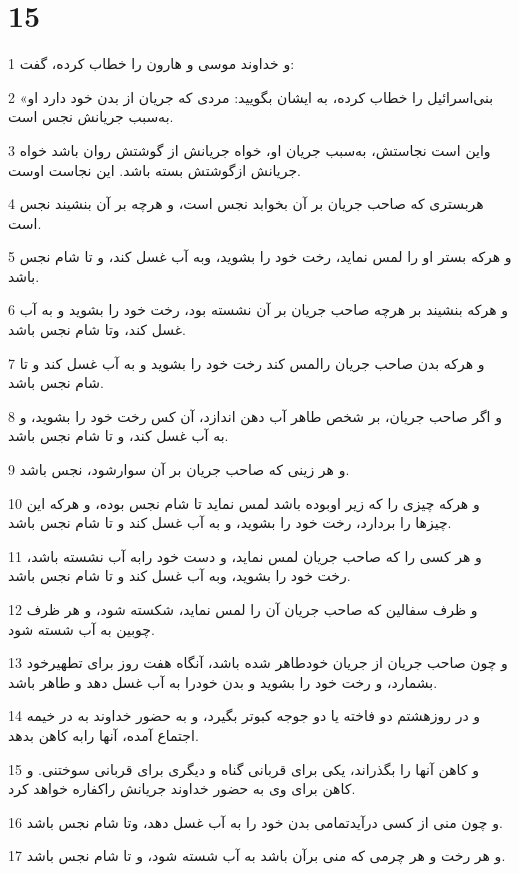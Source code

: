 \chapter{15}

\par 1 و خداوند موسی و هارون را خطاب کرده، گفت:
\par 2 «بنی‌اسرائیل را خطاب کرده، به ایشان بگویید: مردی که جریان از بدن خود دارد او به‌سبب جریانش نجس است.
\par 3 واین است نجاستش، به‌سبب جریان او، خواه جریانش از گوشتش روان باشد خواه جریانش ازگوشتش بسته باشد. این نجاست اوست.
\par 4 هربستری که صاحب جریان بر آن بخوابد نجس است، و هر‌چه بر آن بنشیند نجس است.
\par 5 و هرکه بستر او را لمس نماید، رخت خود را بشوید، وبه آب غسل کند، و تا شام نجس باشد.
\par 6 و هر‌که بنشیند بر هر‌چه صاحب جریان بر آن نشسته بود، رخت خود را بشوید و به آب غسل کند، وتا شام نجس باشد.
\par 7 و هر‌که بدن صاحب جریان رالمس کند رخت خود را بشوید و به آب غسل کند و تا شام نجس باشد.
\par 8 و اگر صاحب جریان، بر شخص طاهر آب دهن اندازد، آن کس رخت خود را بشوید، و به آب غسل کند، و تا شام نجس باشد.
\par 9 و هر زینی که صاحب جریان بر آن سوارشود، نجس باشد.
\par 10 و هر‌که چیزی را که زیر اوبوده باشد لمس نماید تا شام نجس بوده، و هر‌که این چیزها را بردارد، رخت خود را بشوید، و به آب غسل کند و تا شام نجس باشد. 
\par 11 و هر کسی را که صاحب جریان لمس نماید، و دست خود رابه آب نشسته باشد، رخت خود را بشوید، وبه آب غسل کند و تا شام نجس باشد.
\par 12 و ظرف سفالین که صاحب جریان آن را لمس نماید، شکسته شود، و هر ظرف چوبین به آب شسته شود.
\par 13 و چون صاحب جریان از جریان خودطاهر شده باشد، آنگاه هفت روز برای تطهیرخود بشمارد، و رخت خود را بشوید و بدن خودرا به آب غسل دهد و طاهر باشد.
\par 14 و در روزهشتم دو فاخته یا دو جوجه کبوتر بگیرد، و به حضور خداوند به در خیمه اجتماع آمده، آنها رابه کاهن بدهد.
\par 15 و کاهن آنها را بگذراند، یکی برای قربانی گناه و دیگری برای قربانی سوختنی. و کاهن برای وی به حضور خداوند جریانش راکفاره خواهد کرد.
\par 16 و چون منی از کسی درآیدتمامی بدن خود را به آب غسل دهد، وتا شام نجس باشد.
\par 17 و هر رخت و هر چرمی که منی برآن باشد به آب شسته شود، و تا شام نجس باشد.
